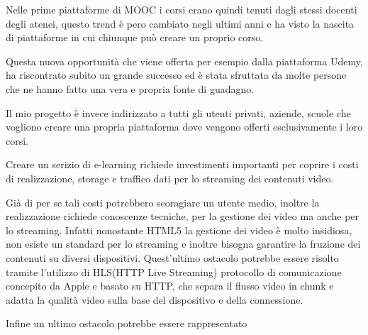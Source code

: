 Nelle prime piattaforme di MOOC i corsi erano quindi tenuti dagli stessi docenti degli atenei, questo trend è pero cambiato negli ultimi anni e ha visto la nascita di piattaforme in cui chiunque può creare un proprio corso.

Questa nuova opportunità che viene offerta per esempio dalla piattaforma Udemy, ha riscontrato subito un grande successo ed è stata sfruttata da molte persone che ne hanno fatto una vera e propria fonte di guadagno. 

Il mio progetto è invece indirizzato a tutti gli utenti privati, aziende, scuole che vogliono creare una propria piattaforma dove vengono offerti esclusivamente i loro corsi.

Creare un serizio di e-learning richiede investimenti importanti per coprire i costi di realizzazione, storage e traffico dati per lo streaming  dei contenuti video.

Già di per se tali costi potrebbero scoragiare un utente medio, inoltre la realizzazione richiede conoscenze tecniche, per la gestione dei video ma anche per lo streaming.
Infatti nonostante HTML5 la gestione dei video è molto insidiosa, non esiste un standard per lo streaming e inoltre bisogna garantire la fruzione dei contenuti su diversi dispositivi.
Quest'ultimo ostacolo potrebbe essere risolto tramite l'utilizzo di HLS(HTTP Live Streaming) protocollo di comunicazione concepito da Apple e basato su HTTP, che separa il flusso video in chunk e adatta la qualità video sulla base del dispositivo e della connessione.

Infine un ultimo ostacolo potrebbe essere rappresentato 

